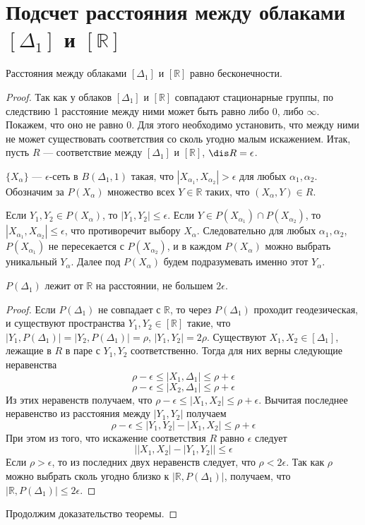 
\section{Подсчет расстояния между облаками $[\Delta_1]$ и $[\mathbb{R}]$}
\begin{theorem}
	Расстояния между облаками $[\Delta_1]$ и $[\mathbb{R}]$ равно бесконечности.
\end{theorem} 

\begin{proof}
	Так как у облаков $[\Delta_1]$ и $[\mathbb{R}]$ совпадают стационарные группы, по следствию 1 расстояние между ними может быть равно либо $0$, либо $\infty$. Покажем, что оно не равно $0$. Для этого необходимо установить, что между ними не может существовать соответствия со сколь угодно малым искажением. Итак, пусть $R$ --- соответствие между $[\Delta_1]$ и $[\mathbb{R}]$, $\dis R = \epsilon$.
	
	$\{X_\alpha\}$ --- $\epsilon$-сеть в $B(\Delta_1,1)$ такая, что $|X_{\alpha_1}, X_{\alpha_2}| > \epsilon$ для любых $\alpha_1, \alpha_2$. Обозначим за $P(X_\alpha)$ множество всех $Y\in \mathbb{R}$ таких, что $(X_\alpha, Y)\in R$.
	
	Если $Y_1, Y_2 \in P(X_\alpha)$, то $|Y_1, Y_2| \le \epsilon$. Если $Y \in P(X_{\alpha_1}) \cap P(X_{\alpha_2})$, то $|X_{\alpha_1}, X_{\alpha_2}| \le \epsilon$, что противоречит выбору $X_\alpha$. Следовательно для любых $\alpha_1, \alpha_2$, $P(X_{\alpha_1})$ не пересекается с $P(X_{\alpha_2})$, и в каждом $P(X_\alpha)$ можно выбрать уникальный $Y_\alpha$. Далее под $P(X_\alpha)$ будем подразумевать именно этот $Y_\alpha$.
	\begin{lemma}
		$P(\Delta_1)$ лежит от $\mathbb{R}$ на расстоянии, не большем $2\epsilon$.
	\end{lemma}
	\begin{proof}
		Если $P(\Delta_1)$ не совпадает с $\mathbb{R}$, то через $P(\Delta_1)$ проходит геодезическая, и существуют пространства $Y_1, Y_2 \in [\mathbb{R}]$ такие, что $|Y_1,P(\Delta_1)| = |Y_2,P(\Delta_1)| = \rho$, $|Y_1,Y_2| = 2\rho$. Существуют $X_1, X_2\in [\Delta_1]$, лежащие в $R$ в паре с $Y_1, Y_2$ соответственно. Тогда для них верны следующие неравенства 
		$$\rho - \epsilon \le |X_1, \Delta_1| \le \rho + \epsilon$$
		$$\rho - \epsilon \le |X_2, \Delta_1| \le \rho + \epsilon$$
		Из этих неравенств получаем, что $\rho - \epsilon \le |X_1, X_2| \le \rho + \epsilon$. Вычитая последнее неравенство из расстояния между $|Y_1, Y_2|$ получаем $$\rho - \epsilon \le |Y_1,Y_2| - |X_1,X_2|\le \rho + \epsilon$$
		При этом из того, что искажение соответствия $R$ равно $\epsilon$ следует
		$$\big||X_1,X_2| - |Y_1, Y_2|\big| \le \epsilon$$ 
		Если $\rho > \epsilon$, то из последних двух неравенств следует, что $\rho < 2\epsilon$. Так как $\rho$ можно выбрать сколь угодно близко к $|\mathbb{R}, P(\Delta_1)|$, получаем, что $|\mathbb{R}, P(\Delta_1)| \le 2\epsilon$.
	\end{proof}
	Продолжим доказательство теоремы.
	

\end{proof}
